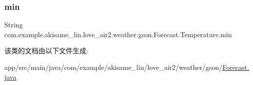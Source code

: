 \subsubsection{\texorpdfstring{min}{min}}
{\footnotesize\ttfamily String com.\+example.\+akisame\+\_\+lin.\+love\+\_\+air2.\+weather.\+gson.\+Forecast.\+Temperature.\+min}



该类的文档由以下文件生成\+:\begin{DoxyCompactItemize}
\item 
app/src/main/java/com/example/akisame\+\_\+lin/love\+\_\+air2/weather/gson/\mbox{\hyperlink{java_2com_2example_2akisame__lin_2love__air2_2weather_2gson_2_forecast_8java}{Forecast.\+java}}\end{DoxyCompactItemize}
